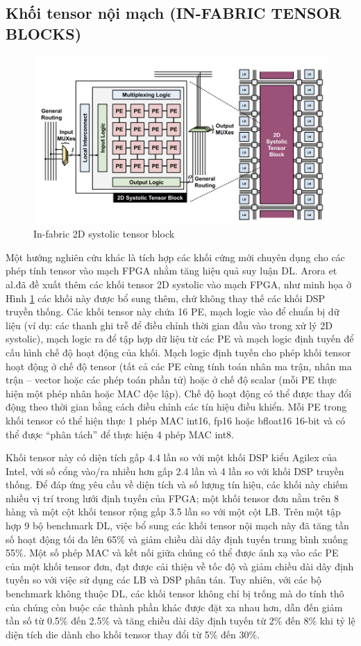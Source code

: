 \documentclass[a4paper]{article}
\begin{document}
\subsection{Khối tensor nội mạch (IN-FABRIC TENSOR BLOCKS)}
\begin{figure} [!h]
    \centering
    \includegraphics[width=0.75\linewidth]{assets/fpga_17.png}
    \caption{In-fabric 2D systolic tensor block}
    \label{fig:fpga_17}
\end{figure}
Một hướng nghiên cứu khác là tích hợp các khối cứng mới chuyên dụng cho các phép tính tensor vào mạch FPGA nhằm tăng hiệu quả suy luận DL. Arora et al.đã đề xuất thêm các khối tensor 2D systolic vào mạch FPGA, như minh họa ở Hình \ref{fig:fpga_17} các khối này được bổ sung thêm, chứ không thay thế các khối DSP truyền thống. Các khối tensor này chứa 16 PE, mạch logic vào để chuẩn bị dữ liệu (ví dụ: các thanh ghi trễ để điều chỉnh thời gian đầu vào trong xử lý 2D systolic), mạch logic ra để tập hợp dữ liệu từ các PE và mạch logic định tuyến để cấu hình chế độ hoạt động của khối. Mạch logic định tuyến cho phép khối tensor hoạt động ở chế độ tensor (tất cả các PE cùng tính toán nhân ma trận, nhân ma trận – vector hoặc các phép toán phần tử) hoặc ở chế độ scalar (mỗi PE thực hiện một phép nhân hoặc MAC độc lập). Chế độ hoạt động có thể được thay đổi động theo thời gian bằng cách điều chỉnh các tín hiệu điều khiển. Mỗi PE trong khối tensor có thể hiện thực 1 phép MAC int16, fp16 hoặc bfloat16 16-bit và có thể được “phân tách” để thực hiện 4 phép MAC int8.

Khối tensor này có diện tích gấp 4.4 lần so với một khối DSP kiểu Agilex của Intel, với số cổng vào/ra nhiều hơn gấp 2.4 lần và 4 lần so với khối DSP truyền thống. Để đáp ứng yêu cầu về diện tích và số lượng tín hiệu, các khối này chiếm nhiều vị trí trong lưới định tuyến của FPGA; một khối tensor đơn nằm trên 8 hàng và một cột khối tensor rộng gấp 3.5 lần so với một cột LB. Trên một tập hợp 9 bộ benchmark DL, việc bổ sung các khối tensor nội mạch này đã tăng tần số hoạt động tối đa lên 65\% và giảm chiều dài dây định tuyến trung bình xuống 55\%. Một số phép MAC và kết nối giữa chúng có thể được ánh xạ vào các PE của một khối tensor đơn, đạt được cải thiện về tốc độ và giảm chiều dài dây định tuyến so với việc sử dụng các LB và DSP phân tán. Tuy nhiên, với các bộ benchmark không thuộc DL, các khối tensor không chỉ bị trống mà do tính thô của chúng còn buộc các thành phần khác được đặt xa nhau hơn, dẫn đến giảm tần số từ 0.5\% đến 2.5\% và tăng chiều dài dây định tuyến từ 2\% đến 8\% khi tỷ lệ diện tích die dành cho khối tensor thay đổi từ 5\% đến 30\%.
\end{document}
